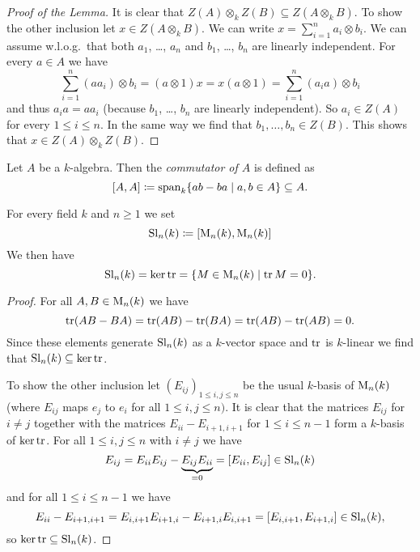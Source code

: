 \begin{proof}[Proof of the Lemma]
 It is clear that $Z(A) \otimes_k Z(B) \subseteq Z(A \otimes_k B)$. To show the other inclusion let $x \in Z(A \otimes_k B)$. We can write $x = \sum_{i=1}^n a_i \otimes b_i$. We can assume w.l.o.g.\ that both $a_1$, \dots, $a_n$ and $b_1$, \dots, $b_n$ are linearly independent. For every $a \in A$ we have
 \[
  \sum_{i=1}^n (a a_i) \otimes b_i
  = (a \otimes 1) x
  = x (a \otimes 1)
  = \sum_{i=1}^n (a_i a) \otimes b_i
 \]
 and thus $a_i a = a a_i$ (because $b_1$, \dots, $b_n$ are linearly independent). So $a_i \in Z(A)$ for every $1 \leq i \leq n$. In the same way we find that $b_1, \dotsc, b_n \in Z(B)$. This shows that $x \in Z(A) \otimes_k Z(B)$.
\end{proof}


\begin{defi}
 Let $A$ be a $k$-algebra. Then the \emph{commutator of $A$} is defined as
 \[
  [A,A] \coloneqq \operatorname{span}_k \{ab-ba \mid a,b \in A\} \subseteq A.
 \]
\end{defi}


\begin{expl}
 For every field $k$ and $n \geq 1$ we set
 \[
  \operatorname{Sl}_n(k) \coloneqq [\operatorname{M}_n(k), \operatorname{M}_n(k)]
 \]
 We then have
 \[
  \operatorname{Sl}_n(k) = \ker \operatorname{tr} = \{M \in \operatorname{M}_n(k) \mid \operatorname{tr} M = 0\}.
 \]
 \begin{proof}
  For all $A, B \in \operatorname{M}_n(k)$ we have
  \[
   \operatorname{tr}(AB-BA) = \operatorname{tr}(AB)-\operatorname{tr}(BA) = \operatorname{tr}(AB)-\operatorname{tr}(AB) = 0.
  \]
  Since these elements generate $\operatorname{Sl}_n(k)$ as a $k$-vector space and $\operatorname{tr}$ is $k$-linear we find that $\operatorname{Sl}_n(k) \subseteq \ker \operatorname{tr}$.
  
  To show the other inclusion let $(E_{ij})_{1 \leq i,j \leq n}$ be the usual $k$-basis of $\operatorname{M}_n(k)$ (where $E_{ij}$ maps $e_j$ to $e_i$ for all $1 \leq i,j \leq n)$. It is clear that the matrices $E_{ij}$ for $i \neq j$ together with the matrices $E_{ii}-E_{i+1,i+1}$ for $1 \leq i \leq n-1$ form a $k$-basis of $\ker \operatorname{tr}$. For all $1 \leq i,j \leq n$ with $i \neq j$ we have
  \[
   E_{ij} = E_{ii} E_{ij} - \underbrace{E_{ij} E_{ii}}_{=0} = [E_{ii}, E_{ij}] \in \operatorname{Sl}_n(k)
  \]
  and for all $1 \leq i \leq n-1$ we have
  \[
   E_{ii} - E_{i+1,i+1} = E_{i,i+1} E_{i+1,i} - E_{i+1,i} E_{i,i+1} = [E_{i,i+1}, E_{i+1,i}] \in \operatorname{Sl}_n(k),
  \]
  so $\ker \operatorname{tr} \subseteq \operatorname{Sl}_n(k)$.
 \end{proof}
\end{expl}


